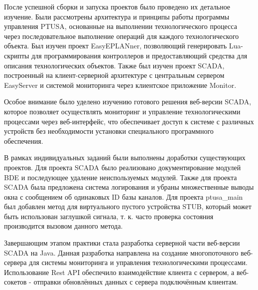 {\par \redline После успешной сборки и запуска проектов было проведено их детальное изучение. Были рассмотрены архитектура и принципы работы программы управления PTUSA, основанные на выполнении технологического процесса через последовательное выполнение операций для каждого технологического объекта. Был изучен проект EasyEPLANner, позволяющий генерировать Lua-скрипты для программирования контроллеров и предоставляющий средства для описания технологических объектов. Также был изучен проект SCADA, построенный на клиент-серверной архитектуре с центральным сервером EasySer\-ver и системой мониторинга через клиентское приложение Monitor.

\par \redline Особое внимание было уделено изучению готового решения веб-версии SCADA, которое позволяет осуществлять мониторинг и управление технологическими процессами через веб-интерфейс, что обеспечивает доступ к системе с различных устройств без необходимости установки специального программного обеспечения.

\par \redline В рамках индивидуальных заданий были выполнены доработки существующих проектов. Для проекта SCADA было реализовано документирование модулей BDE и последующее удаление неиспользуемых модулей. Также для проекта SCADA была предложена система логирования и убраны множественные выводы окна с сообщением об одинаковых ID базы каналов. Для проекта ptusa\_main был добавлен метод для виртуального пустого устройства STUB, который может быть использован заглушкой сигнала, т. к. часто проверка состояния производится вызовом данного метода.

\par \redline Завершающим этапом практики стала разработка серверной части веб-версии SCA\-DA на Java. Данная разработка направлена на создание многопоточного веб-сервера для системы мониторинга и управления технологическими процессами. Использование Rest API обеспечило взаимодействие клиента с сервером, а веб-сокетов - отправки обновлённых данных с сервера подключённым клиентам.

\par
}



